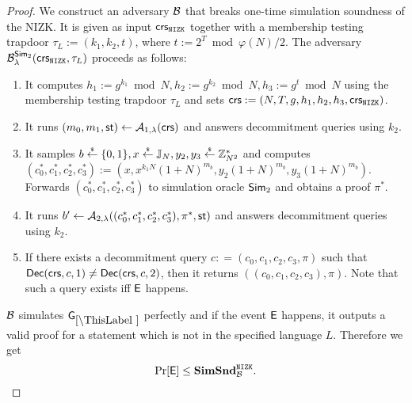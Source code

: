 \begin{proof}
We construct an adversary $\mathcal{B}$ that breaks one-time simulation soundness of the NIZK. It is given as input $\mathsf{crs}_{\mathtt{NIZK}}$ together with a membership testing trapdoor $\tau_L:=(k_1, k_2, t)$, where $t:=2^T \bmod \varphi(N)/2$. 
%
The adversary $\mathcal{B}_{\lambda}^{\mathsf{Sim}_2}(\mathsf{crs}_{\mathtt{NIZK}}, \tau_L)$ proceeds as follows:
\vspace{-2mm}
\begin{enumerate}
\item It computes $h_1:= g^{k_1} \bmod N, h_2:= g^{k_2} \bmod N, h_3:= g^{t} \bmod N$ using the membership testing trapdoor $\tau_L$ and sets $\mathsf{crs}:=(N, T, g, h_1, h_2, h_3, \mathsf{crs}_{\mathtt{NIZK}})$.
\item It runs $(m_0, m_1, \mathsf{st}) \leftarrow \mathcal{A}_{1, \lambda}(\mathsf{crs})$ and answers decommitment queries using $k_2$.
\item It samples $b \stackrel{{\scriptscriptstyle\$}}{\leftarrow} \{0,1\}, x \stackrel{{\scriptscriptstyle\$}}{\leftarrow} \mathbb{J}_N, y_2, y_3 \stackrel{{\scriptscriptstyle\$}}{\leftarrow} \mathbb{Z}_{N^2}^*$ and computes $(c_0^*, c_1^*, c_2^*, c_3^*):=(x, x^{k_1 N} (1+N)^{m_b}, y_2 (1+N)^{m_b}, y_3 (1+N)^{m_b})$. Forwards $(c_0^*, c_1^*, c_2^*, c_3^*)$ to simulation oracle $\mathsf{Sim}_2$ and obtains a proof $\pi^*$.
\item It runs $b' \leftarrow \mathcal{A}_{2, \lambda}((c_0^*, c_1^*, c_2^*, c_3^*), \pi^*, \mathsf{st})$ and answers decommitment queries using $k_2$.
\item If there exists a decommitment query $c: = (c_0, c_1, c_2, c_3, \pi)$ such that $\mathsf{Dec}(\mathsf{crs}, c, 1) \neq \mathsf{Dec}(\mathsf{crs},c,2)$, then it returns $((c_0, c_1, c_2, c_3), \pi)$. Note that such a query exists iff $\mathsf{E}$ happens.
\end{enumerate}

$\mathcal{B}$ simulates $\games_\thisgame$ perfectly and if the event $\mathsf{E}$ happens, it outputs a valid proof for a statement which is not in the specified language $L$. Therefore we get
\[\Pr[\mathsf{E}] \leq \mathbf{SimSnd}^{\mathtt{NIZK}}_{\mathcal{B}}.\]

%
%
%


\end{proof}

